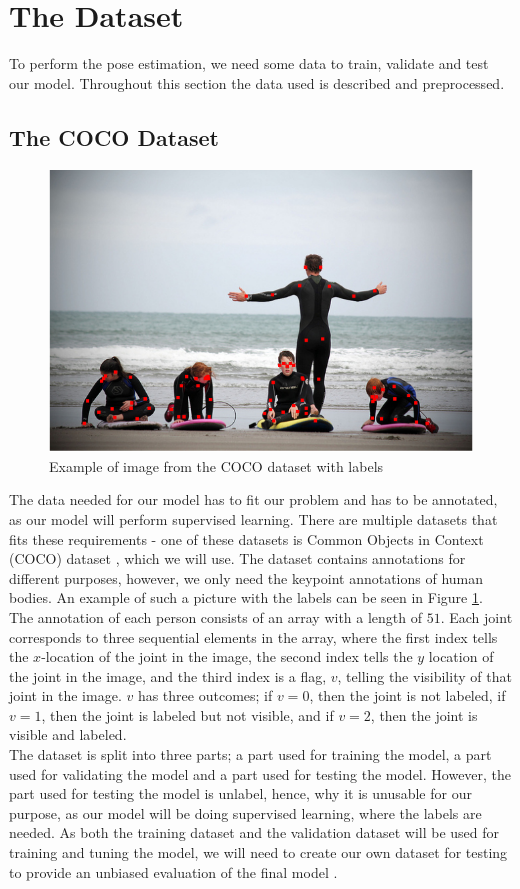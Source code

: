 \documentclass[main.tex]{subfiles}
\begin{document}
\section{The Dataset}
To perform the pose estimation, we need some data to train, validate and test our model. Throughout this section the data used is described and preprocessed.

\subsection{The COCO Dataset}
\begin{figure}[H]
    \centering
    \includegraphics[height = 4 cm]{../entities/coco_example.png}
    \caption{Example of image from the COCO dataset with labels}
    \label{fig:coco_example}
\end{figure}
The data needed for our model has to fit our problem and has to be annotated, as our model will perform supervised learning. There are multiple datasets that fits these requirements - one of these datasets is Common Objects in Context (COCO) dataset \cite{COCO_article}, which we will use. The dataset contains annotations for different purposes, however, we only need the keypoint annotations of human bodies. An example of such a picture with the labels can be seen in Figure \ref{fig:coco_example}. \\
The annotation of each person consists of an array with a length of $51$. Each joint corresponds to three sequential elements in the array, where the first index tells the $x$-location of the joint in the image, the second index tells the $y$ location of the joint in the image, and the third index is a flag, $v$, telling the visibility of that joint in the image. $v$ has three outcomes; if $v = 0$, then the joint is not labeled, if $v = 1$, then the joint is labeled but not visible, and if $v = 2$, then the joint is visible and labeled. \\
The dataset is split into three parts; a part used for training the model, a part used for validating the model and a part used for testing the model. However, the part used for testing the model is unlabel, hence, why it is unusable for our purpose, as our model will be doing supervised learning, where the labels are needed. As both the training dataset and the validation dataset will be used for training and tuning the model, we will need to create our own dataset for testing to provide an unbiased evaluation of the final model \cite{validation_vs_testing}. \\
\end{document}
